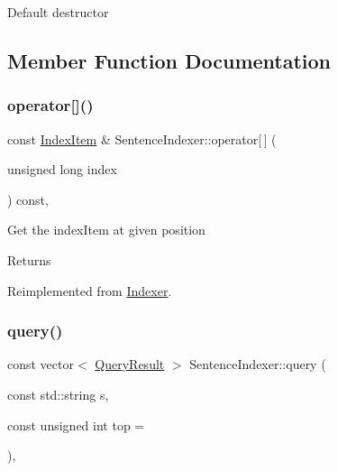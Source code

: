 Default destructor 

\subsection{Member Function Documentation}
\mbox{\label{classSentenceIndexer_a0c0b7ee70c1d183e6bd6ca4ee412831c}} 
\subsubsection{\texorpdfstring{operator[]()}{operator[]()}}
{\footnotesize\ttfamily const \hyperlink{classIndexItem}{Index\+Item} \& Sentence\+Indexer\+::operator\mbox{[}$\,$\mbox{]} (\begin{DoxyParamCaption}\item[{unsigned long}]{index }\end{DoxyParamCaption}) const\hspace{0.3cm}{\ttfamily [override]}, {\ttfamily [virtual]}}

Get the index\+Item at given position \begin{DoxyReturn}{Returns}

\end{DoxyReturn}


Reimplemented from \hyperlink{classIndexer_ac9a2012415a2b06251852047e30bf618}{Indexer}.

\mbox{\label{classSentenceIndexer_ac9b17bde40b851d8e0c263ce2241b9c4}} 
\subsubsection{\texorpdfstring{query()}{query()}}
{\footnotesize\ttfamily const vector$<$ \hyperlink{classQueryResult}{Query\+Result} $>$ Sentence\+Indexer\+::query (\begin{DoxyParamCaption}\item[{const std\+::string}]{s,  }\item[{const unsigned int}]{top = {} }\end{DoxyParamCaption})\hspace{0.3cm}{\ttfamily [override]}, {\ttfamily [virtual]}}

